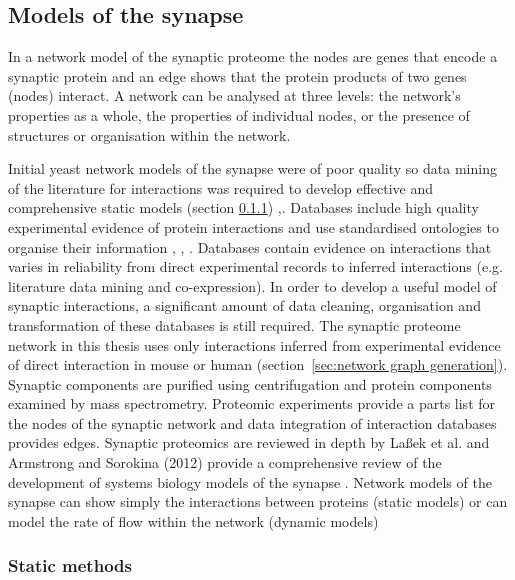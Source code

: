 \subsection{Models of the synapse}
\label{sec:models of the synapse}

 In a network model of the synaptic proteome the nodes are genes that encode a synaptic protein and an edge shows that the protein products of two genes (nodes) interact. A network can be analysed at three levels: the network’s properties as a whole, the properties of individual nodes, or the presence of structures or organisation within the network\cite{newman2012communities}.  
 
 
Initial yeast network models of the synapse were of poor quality so data mining of the literature for interactions was required to develop effective and comprehensive static models (section \ref{sec:static models}) \cite{pocklington2006proteomes},\cite{armstrong2012evolution}. Databases include high quality experimental evidence of protein interactions and use standardised ontologies to organise their information \cite{brazma2006standards}, \cite{hermjakob2004hupo}, \cite{kerrien2007broadening}. Databases contain evidence on interactions that varies in reliability from direct experimental records to inferred interactions (e.g. literature data mining and co-expression). In order to develop a useful model of synaptic interactions, a significant amount of data cleaning, organisation and transformation of these databases is still required. The synaptic proteome network in this thesis uses only interactions inferred from experimental evidence of direct interaction in mouse or human (section~\ref{sec:network graph generation}). Synaptic components are purified using centrifugation and protein components examined by mass spectrometry. Proteomic experiments provide a parts list for the nodes of the synaptic network and data integration of interaction databases provides edges.  Synaptic proteomics are reviewed in depth by La{\ss}ek et al. \cite{lassek2014proteome} and Armstrong and Sorokina (2012) provide a comprehensive review of the development of systems biology models of the synapse \cite{armstrong2012evolution}. Network models of the synapse can show simply the interactions between proteins (static models) or can model the rate of flow within the network (dynamic models)

\subsubsection{Static methods}
\label{sec:static models}


